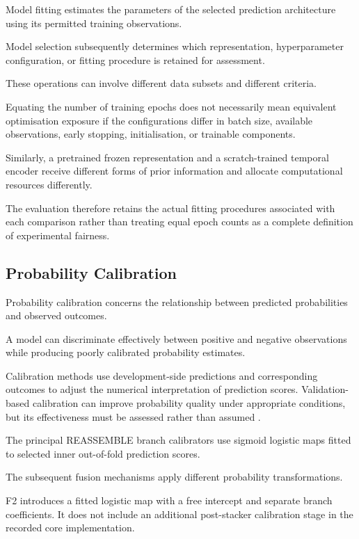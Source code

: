 Model fitting estimates the parameters of the selected prediction architecture using its permitted training observations.

Model selection subsequently determines which representation, hyperparameter configuration, or fitting procedure is retained for assessment.

These operations can involve different data subsets and different criteria.

Equating the number of training epochs does not necessarily mean equivalent optimisation exposure if the configurations differ in batch size, available observations, early stopping, initialisation, or trainable components.

Similarly, a pretrained frozen representation and a scratch-trained temporal encoder receive different forms of prior information and allocate computational resources differently.

The evaluation therefore retains the actual fitting procedures associated with each comparison rather than treating equal epoch counts as a complete definition of experimental fairness.

\subsection{Probability Calibration}

Probability calibration concerns the relationship between predicted probabilities and observed outcomes.

A model can discriminate effectively between positive and negative observations while producing poorly calibrated probability estimates.

Calibration methods use development-side predictions and corresponding outcomes to adjust the numerical interpretation of prediction scores. Validation-based calibration can improve probability quality under appropriate conditions, but its effectiveness must be assessed rather than assumed \parencite{Guo2017Calibration}.

The principal REASSEMBLE branch calibrators use sigmoid logistic maps fitted to selected inner out-of-fold prediction scores.

The subsequent fusion mechanisms apply different probability transformations.

F2 introduces a fitted logistic map with a free intercept and separate branch coefficients. It does not include an additional post-stacker calibration stage in the recorded core implementation.

